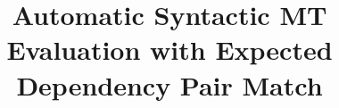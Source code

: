 \documentclass[11pt]{article}
\title{Automatic Syntactic MT Evaluation with Expected Dependency
  Pair Match}
\author{\blindthis{
    Jeremy G. Kahn \and Mari Ostendorf \\
    Signal, Speech \& Lang.\ Interpretation Lab\\
    University of Washington,
    Seattle, WA\\
    {\tt \{jgk,mo\}@ssli.ee.washington.edu}
    \And
    Brian Roark\\
    Ctr.\ for Spoken Lang.\ Understanding \\
    OHSU, Portland, OR\\
    {\tt roark@cslu.ogi.edu}
  }
}
\date{}
\newcommand{\myEDPM}[0]{\ensuremath{\mathrm{EDPM}}}
\begin{document}
\maketitle

\end{document}
